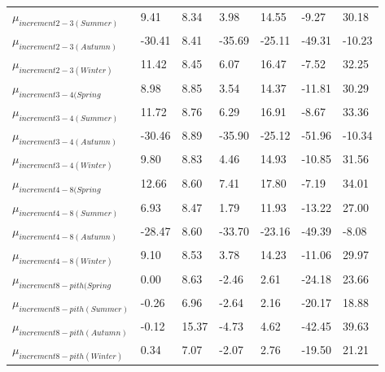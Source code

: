 \documentclass{article}\usepackage[]{graphicx}\usepackage[]{color}
\begin{document}
\begin{table}[ht]
\begin{tabular}{|p{}|p{}|p{}|p{}|p{}|p{}|p{}|}
  $\mu_{increment 2-3 (Summer)}$ & 9.41 & 8.34 & 3.98 & 14.55 & -9.27 & 30.18 \\ 
  $\mu_{increment 2-3 (Autumn)}$ & -30.41 & 8.41 & -35.69 & -25.11 & -49.31 & -10.23 \\ 
  $\mu_{increment 2-3 (Winter)}$ & 11.42 & 8.45 & 6.07 & 16.47 & -7.52 & 32.25 \\ 
  $\mu_{increment 3-4 (Spring}$ & 8.98 & 8.85 & 3.54 & 14.37 & -11.81 & 30.29 \\ 
  $\mu_{increment 3-4 (Summer)}$ & 11.72 & 8.76 & 6.29 & 16.91 & -8.67 & 33.36 \\ 
  $\mu_{increment 3-4 (Autumn)}$ & -30.46 & 8.89 & -35.90 & -25.12 & -51.96 & -10.34 \\ 
  $\mu_{increment 3-4 (Winter)}$ & 9.80 & 8.83 & 4.46 & 14.93 & -10.85 & 31.56 \\ 
  $\mu_{increment 4-8 (Spring}$ & 12.66 & 8.60 & 7.41 & 17.80 & -7.19 & 34.01 \\ 
  $\mu_{increment 4-8 (Summer)}$ & 6.93 & 8.47 & 1.79 & 11.93 & -13.22 & 27.00 \\ 
  $\mu_{increment 4-8 (Autumn)}$ & -28.47 & 8.60 & -33.70 & -23.16 & -49.39 & -8.08 \\ 
  $\mu_{increment 4-8 (Winter)}$ & 9.10 & 8.53 & 3.78 & 14.23 & -11.06 & 29.97 \\ 
  $\mu_{increment 8-pith (Spring}$ & 0.00 & 8.63 & -2.46 & 2.61 & -24.18 & 23.66 \\ 
  $\mu_{increment 8-pith (Summer)}$ & -0.26 & 6.96 & -2.64 & 2.16 & -20.17 & 18.88 \\ 
  $\mu_{increment 8-pith (Autumn)}$ & -0.12 & 15.37 & -4.73 & 4.62 & -42.45 & 39.63 \\ 
  $\mu_{increment 8-pith (Winter)}$ & 0.34 & 7.07 & -2.07 & 2.76 & -19.50 & 21.21 \\ 
   \hline
\end{tabular}
\endgroup
\end{table}
\end{document}
